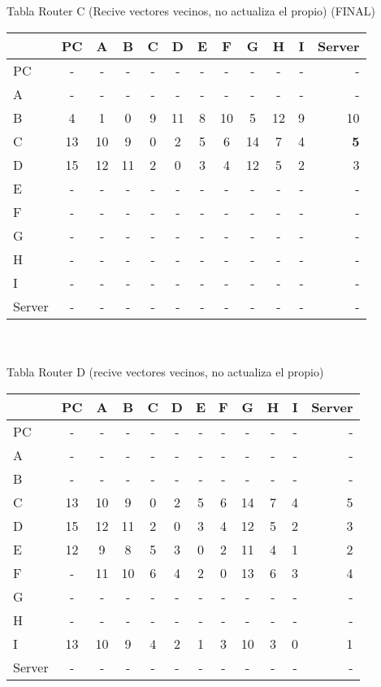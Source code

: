\documentclass{article}
\begin{document}
\\
\\
Tabla Router C (Recive vectores vecinos, no actualiza el propio) (FINAL) \\
\begin{tabular}{l*{10}{c}r}
              & PC & A & B & C & D & E & F & G & H & I & Server \\
\hline
PC             & - & - & - & - & - & - & - & - & - & - & -\\
A              & - & - & - & - & - & - & - & - & - & - & -\\
B              & 4 & 1 & 0 & 9 & 11	& 8 & 10 & 5 & 12 & 9 & 10\\
C              & 13 & 10 & 9 & 0 & 2 & 5 & 6 & 14 & 7 & 4 &\bf{5}\\
D              & 15 & 12 & 11 & 2 & 0 & 3 & 4 & 12 & 5 & 2 & 3\\
E              & - & - & - & - & - & - & - & - & - & - & -\\
F              & - & - & - & - & - & - & - & - & - & - & -\\
G              & - & - & - & - & - & - & - & - & - & - & -\\
H              & - & - & - & - & - & - & - & - & - & - & -\\
I              & - & - & - & - & - & - & - & - & - & - & -\\
Server         & - & - & - & - & - & - & - & - & - & - & -\\
\end{tabular}
\\
\\
Tabla Router D (recive vectores vecinos, no actualiza el propio)	 \\
\begin{tabular}{l*{10}{c}r}
              & PC & A & B & C & D & E & F & G & H & I & Server \\
\hline
PC             & - & - & - & - & - & - & - & - & - & - & -\\
A              & - & - & - & - & - & - & - & - & - & - & -\\
B              & - & - & - & - & - & - & - & - & - & - & -\\
C              & 13 & 10 & 9 & 0 & 2 & 5 & 6 & 14 & 7 & 4 & 5\\
D              & 15 & 12 & 11 & 2 & 0 & 3 & 4 & 12 & 5 & 2 & 3\\
E              & 12 & 9 & 8 & 5 & 3 & 0 & 2 & 11 & 4 & 1 & 2\\
F              & - & 11 & 10 & 6 & 4 & 2 & 0 & 13 & 6 & 3 & 4\\
G              & - & - & - & - & - & - & - & - & - & - & -\\
H              & - & - & - & - & - & - & - & - & - & - & -\\
I              & 13 & 10 & 9 & 4 & 2 & 1 & 3 & 10 & 3 & 0 & 1\\
Server         & - & - & - & - & - & - & - & - & - & - & -\\

\end{tabular}\\
\end{document}
